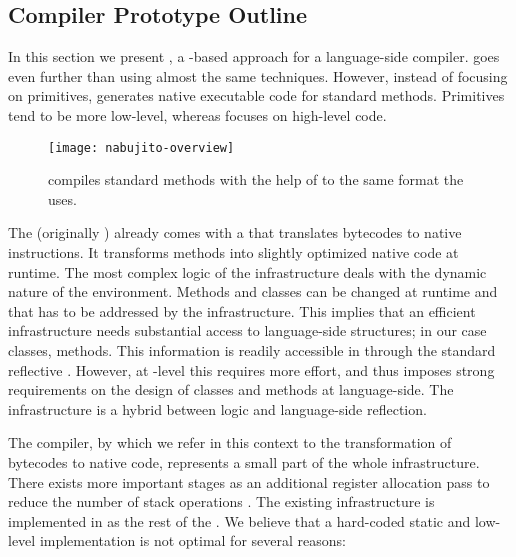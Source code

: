 \subsection{\NBJ \JIT Compiler Prototype Outline}
In this section we present \NBJ, a \B-based approach for a language-side \JIT compiler.
\NBJ goes even further than \WF using almost the same techniques.
However, instead of focusing on primitives, \NBJ generates native executable code for standard \PH methods.
Primitives tend to be more low-level, whereas \NBJ focuses on high-level \PH code. 

\begin{figure}[h]
	\centering
	\texttt{[image: nabujito-overview]}
	\caption[\NBJ Overview]{\NBJ compiles standard \PH methods with the help of \B to the same format the \VM \JIT uses.}
\end{figure}

\noindent The \PH \VM (originally ) already comes with a \JIT that translates bytecodes to native instructions.
It transforms \PH methods into slightly optimized native code at runtime.
The most complex logic of the \JIT infrastructure deals with the dynamic nature of the \PH environment.
Methods and classes can be changed at runtime and that has to be addressed by the \JIT infrastructure.
This implies that an efficient \JIT infrastructure needs substantial access to language-side structures; in our case classes, methods.
This information is readily accessible in \PH through the standard reflective \API.
However, at \VM-level this requires more effort, and thus imposes strong requirements on the design of classes and methods at language-side.
The \JIT infrastructure is a hybrid between \VM logic and language-side reflection.

The \JIT compiler, by which we refer in this context to the transformation of bytecodes to native code, represents a small part of the whole \JIT infrastructure.
There exists more important stages as an additional register allocation pass to reduce the number of stack operations \cite{Mira99a,Mira11a}.
The existing \JIT infrastructure is implemented in \Slang \cite[Ch.\ 5]{Blac09a} as the rest of the \VM.
We believe that a hard-coded static and low-level implementation is not optimal for several reasons:

